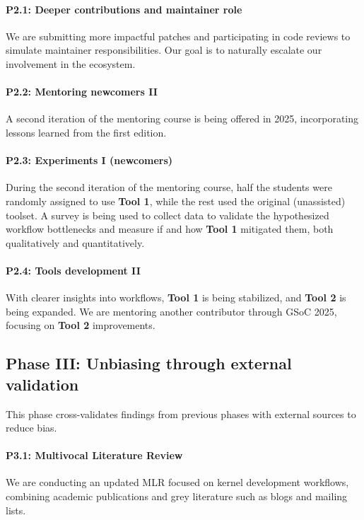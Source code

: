 \documentclass[sigconf]{acmart} %
\begin{document}
\paragraph{P2.1: Deeper contributions and maintainer role}
We are submitting more impactful patches and participating in code reviews to
simulate maintainer responsibilities. Our goal is to naturally escalate our
involvement in the ecosystem.

\paragraph{P2.2: Mentoring newcomers II}
A second iteration of the mentoring course is being offered in 2025,
incorporating lessons learned from the first edition.

\paragraph{P2.3: Experiments I (newcomers)}
During the second iteration of the mentoring course, half the students were
randomly assigned to use \textbf{Tool 1}, while the rest used the original
(unassisted) toolset. A survey is being used to collect data to validate the
hypothesized workflow bottlenecks and measure if and how \textbf{Tool 1}
mitigated them, both qualitatively and quantitatively.

\paragraph{P2.4: Tools development II}
With clearer insights into workflows, \textbf{Tool 1} is being stabilized, and
\textbf{Tool 2} is being expanded. We are mentoring another contributor through
GSoC 2025, focusing on \textbf{Tool 2} improvements.

\subsection{Phase III: Unbiasing through external validation}
This phase cross-validates findings from previous phases with external sources
to reduce bias.

\paragraph{P3.1: Multivocal Literature Review}
We are conducting an updated MLR focused on kernel development workflows,
combining academic publications and grey literature such as blogs and mailing
lists.
\end{document}

